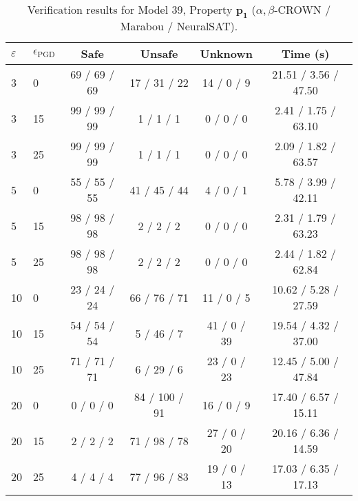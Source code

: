 \begin{table}[htbp]\centering
\caption{\small Verification results for Model 39, Property $\mathbf{p_{1}}$ ($\alpha,\beta$-CROWN / Marabou / NeuralSAT).}
\label{tab:model39_p1}
\begin{tabular}{llcccc}
\toprule
$\varepsilon$ & $\epsilon_{\scriptscriptstyle\mathrm{PGD}}$ & Safe & Unsafe & Unknown & Time (s) \\
\midrule
3 & 0 & 69 / 69 / 69 & 17 / 31 / 22 & 14 / 0 / 9 & 21.51 / 3.56 / 47.50 \\
3 & 15 & 99 / 99 / 99 & 1 / 1 / 1 & 0 / 0 / 0 & 2.41 / 1.75 / 63.10 \\
3 & 25 & 99 / 99 / 99 & 1 / 1 / 1 & 0 / 0 / 0 & 2.09 / 1.82 / 63.57 \\
5 & 0 & 55 / 55 / 55 & 41 / 45 / 44 & 4 / 0 / 1 & 5.78 / 3.99 / 42.11 \\
5 & 15 & 98 / 98 / 98 & 2 / 2 / 2 & 0 / 0 / 0 & 2.31 / 1.79 / 63.23 \\
5 & 25 & 98 / 98 / 98 & 2 / 2 / 2 & 0 / 0 / 0 & 2.44 / 1.82 / 62.84 \\
10 & 0 & 23 / 24 / 24 & 66 / 76 / 71 & 11 / 0 / 5 & 10.62 / 5.28 / 27.59 \\
10 & 15 & 54 / 54 / 54 & 5 / 46 / 7 & 41 / 0 / 39 & 19.54 / 4.32 / 37.00 \\
10 & 25 & 71 / 71 / 71 & 6 / 29 / 6 & 23 / 0 / 23 & 12.45 / 5.00 / 47.84 \\
20 & 0 & 0 / 0 / 0 & 84 / 100 / 91 & 16 / 0 / 9 & 17.40 / 6.57 / 15.11 \\
20 & 15 & 2 / 2 / 2 & 71 / 98 / 78 & 27 / 0 / 20 & 20.16 / 6.36 / 14.59 \\
20 & 25 & 4 / 4 / 4 & 77 / 96 / 83 & 19 / 0 / 13 & 17.03 / 6.35 / 17.13 \\
\bottomrule
\end{tabular}
\end{table}
